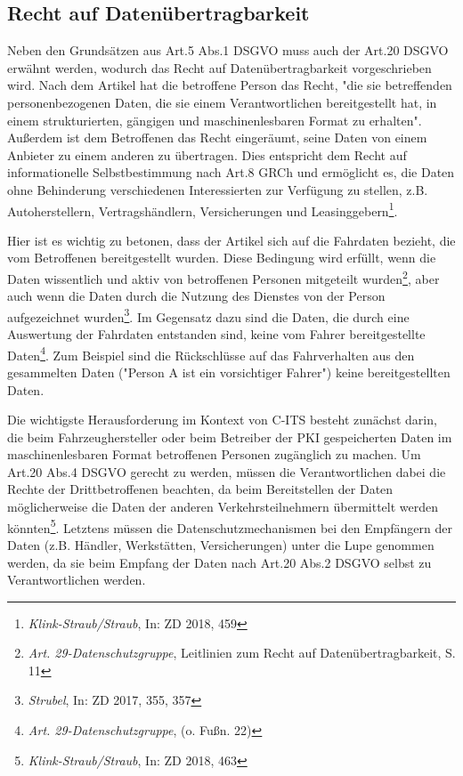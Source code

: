 \subsection{Recht auf Datenübertragbarkeit}

Neben den Grundsätzen aus Art.5 Abs.1 DSGVO muss auch der Art.20 DSGVO erwähnt werden, wodurch das Recht auf Datenübertragbarkeit vorgeschrieben wird. Nach dem Artikel hat die betroffene Person das Recht, "die sie betreffenden personenbezogenen Daten, die sie einem Verantwortlichen bereitgestellt hat, in einem strukturierten, gängigen und maschinenlesbaren Format zu erhalten". Außerdem ist dem Betroffenen das Recht eingeräumt, seine Daten von einem Anbieter zu einem anderen zu übertragen. Dies entspricht dem Recht auf informationelle Selbstbestimmung nach Art.8 GRCh und ermöglicht es, die Daten ohne Behinderung verschiedenen Interessierten zur Verfügung zu stellen, z.B. Autoherstellern, Vertragshändlern, Versicherungen und Leasinggebern\footnote{\emph{Klink-Straub/Straub}, In: ZD 2018, 459}.

Hier ist es wichtig zu betonen, dass der Artikel sich auf die Fahrdaten bezieht, die vom Betroffenen bereitgestellt wurden. Diese Bedingung wird erfüllt, wenn die Daten wissentlich und aktiv von betroffenen Personen mitgeteilt wurden\footnote{\emph{Art. 29-Datenschutzgruppe}, Leitlinien zum Recht auf Datenübertragbarkeit, S. 11}, aber auch wenn die Daten durch die Nutzung des Dienstes von der Person aufgezeichnet wurden\footnote{\emph{Strubel}, In: ZD 2017, 355, 357}. Im Gegensatz dazu sind die Daten, die durch eine Auswertung der Fahrdaten entstanden sind, keine vom Fahrer bereitgestellte Daten\footnote{\emph{Art. 29-Datenschutzgruppe}, (o. Fußn. 22)}. Zum Beispiel sind die Rückschlüsse auf das Fahrverhalten aus den gesammelten Daten ("Person A ist ein vorsichtiger Fahrer") keine bereitgestellten Daten. 

Die wichtigste Herausforderung im Kontext von C-ITS besteht zunächst darin, die beim Fahrzeughersteller oder beim Betreiber der PKI gespeicherten Daten im maschinenlesbaren Format betroffenen Personen zugänglich zu machen. Um Art.20 Abs.4 DSGVO gerecht zu werden, müssen die Verantwortlichen dabei die Rechte der Drittbetroffenen beachten, da beim Bereitstellen der Daten möglicherweise die Daten der anderen Verkehrsteilnehmern übermittelt werden könnten\footnote{\emph{Klink-Straub/Straub}, In: ZD 2018, 463}. Letztens müssen die Datenschutzmechanismen bei den Empfängern der Daten (z.B. Händler, Werkstätten, Versicherungen) unter die Lupe genommen werden, da sie beim Empfang der Daten nach Art.20 Abs.2 DSGVO selbst zu Verantwortlichen werden.



